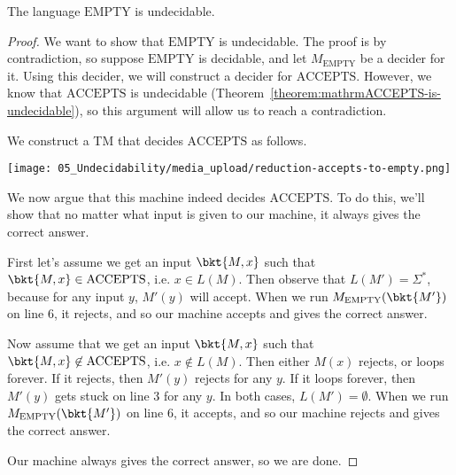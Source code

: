 \begin{flex}
\label{grp:theorem:mathrmEMPTY-is-undecidable}

\begin{theorem}
\label{theorem:mathrmEMPTY-is-undecidable}
The language $\mathrm{EMPTY}$ is undecidable.

\end{theorem}

\begin{proof}
\label{prf:Undecidable-Languages::show}
We want to show that $\text{EMPTY}$ is undecidable. The proof is by contradiction, so suppose $\text{EMPTY}$ is decidable, and let $M_\text{EMPTY}$ be a decider for it. Using this decider, we will construct a decider for $\text{ACCEPTS}$. However, we know that $\text{ACCEPTS}$ is undecidable (Theorem~\ref{theorem:mathrmACCEPTS-is-undecidable}), so this argument will allow us to reach a contradiction.

We construct a TM that decides $\text{ACCEPTS}$ as follows.

\begin{center}
\texttt{[image: 05\_Undecidability/media\_upload/reduction-accepts-to-empty.png]}
\end{center}

We now argue that this machine indeed decides $\text{ACCEPTS}$. To do this, we'll show that no matter what input is given to our machine, it always gives the correct answer. 

First let's assume we get an input $\bkt{M,x}$ such that $\bkt{M,x} \in \text{ACCEPTS}$, i.e. $x \in L(M)$. Then observe that $L(M') = \Sigma^*$, because for any input $y$, $M'(y)$ will accept. When we run $M_\text{EMPTY}(\bkt{M'})$ on line 6, it rejects, and so our machine accepts and gives the correct answer. 

Now assume that we get an input $\bkt{M,x}$ such that $\bkt{M,x} \not \in \text{ACCEPTS}$, i.e. $x \not \in L(M)$. Then either $M(x)$ rejects, or loops forever. If it rejects, then $M'(y)$ rejects for any $y$. If it loops forever, then $M'(y)$ gets stuck on line 3 for any $y$. In both cases, $L(M') = \emptyset$. When we run $M_\text{EMPTY}(\bkt{M'})$ on line 6, it accepts, and so our machine rejects and gives the correct answer. 

Our machine always gives the correct answer, so we are done.

\end{proof}
\end{flex}

